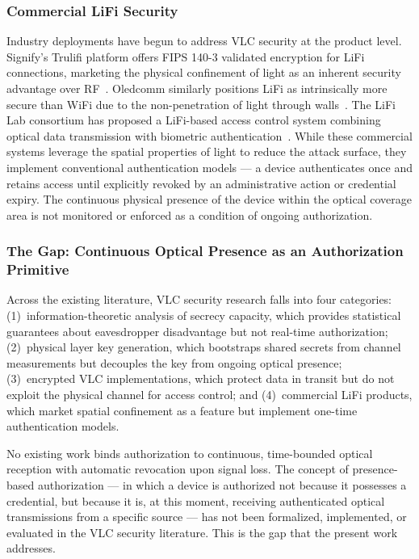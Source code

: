 \documentclass[conference]{IEEEtran}
\begin{document}
\subsubsection{Commercial LiFi Security}

Industry deployments have begun to address VLC security at the product level. Signify's Trulifi platform offers FIPS 140-3 validated encryption for LiFi connections, marketing the physical confinement of light as an inherent security advantage over RF~\cite{signify2024}. Oledcomm similarly positions LiFi as intrinsically more secure than WiFi due to the non-penetration of light through walls~\cite{oledcomm2024}. The LiFi Lab consortium has proposed a LiFi-based access control system combining optical data transmission with biometric authentication~\cite{lifilab2024}. While these commercial systems leverage the spatial properties of light to reduce the attack surface, they implement conventional authentication models --- a device authenticates once and retains access until explicitly revoked by an administrative action or credential expiry. The continuous physical presence of the device within the optical coverage area is not monitored or enforced as a condition of ongoing authorization.

\subsubsection{The Gap: Continuous Optical Presence as an Authorization Primitive}

Across the existing literature, VLC security research falls into four categories: (1)~information-theoretic analysis of secrecy capacity, which provides statistical guarantees about eavesdropper disadvantage but not real-time authorization; (2)~physical layer key generation, which bootstraps shared secrets from channel measurements but decouples the key from ongoing optical presence; (3)~encrypted VLC implementations, which protect data in transit but do not exploit the physical channel for access control; and (4)~commercial LiFi products, which market spatial confinement as a feature but implement one-time authentication models.

No existing work binds authorization to continuous, time-bounded optical reception with automatic revocation upon signal loss. The concept of presence-based authorization --- in which a device is authorized not because it possesses a credential, but because it is, at this moment, receiving authenticated optical transmissions from a specific source --- has not been formalized, implemented, or evaluated in the VLC security literature. This is the gap that the present work addresses.
\end{document}
